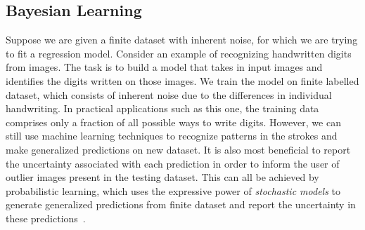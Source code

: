 \subsection{Bayesian Learning}
\label{ssec:bayesianLearning}

Suppose we are given a finite dataset with inherent noise, for which we are
trying to fit a regression model.
%
Consider an example of recognizing handwritten digits from images.
%
The task is to build a model that takes in input images and identifies the
digits written on those images.
%
We train the model on finite labelled dataset, which consists of inherent noise
due to the differences in individual handwriting.
%
In practical applications such as this one, the training data comprises only a
fraction of all possible ways to write digits.
%
However, we can still use machine learning techniques to recognize patterns in
the strokes and make generalized predictions on new dataset.
%
It is also most beneficial to report the uncertainty associated with each
prediction in order to inform the user of outlier images present in the testing
dataset.
%
This can all be achieved by probabilistic learning, which uses the expressive power
of \textit{stochastic models} to generate generalized predictions from finite
dataset and report the uncertainty in these predictions~\cite{bishop2006pattern}.


